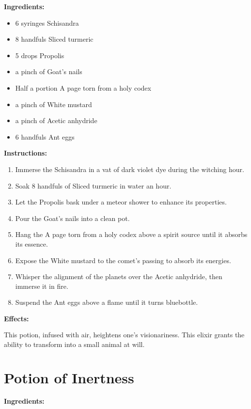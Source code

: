 \documentclass{article}
\begin{document}
\textbf{Ingredients:}

\begin{itemize}
  \item 6 syringes Schisandra
  \item 8 handfuls Sliced ​​turmeric
  \item 5 drops Propolis
  \item a pinch of Goat's nails
  \item Half a portion A page torn from a holy codex
  \item a pinch of White mustard
  \item a pinch of Acetic anhydride
  \item 6 handfuls Ant eggs
\end{itemize}

\textbf{Instructions:}

\begin{enumerate}
  \item Immerse the Schisandra in a vat of dark violet dye during the witching hour.
  \item Soak 8 handfuls of Sliced ​​turmeric in water an hour.
  \item Let the Propolis bask under a meteor shower to enhance its properties.
  \item Pour the Goat's nails into a clean pot.
  \item Hang the A page torn from a holy codex above a spirit source until it absorbs its essence.
  \item Expose the White mustard to the comet’s passing to absorb its energies.
  \item Whisper the alignment of the planets over the Acetic anhydride, then immerse it in fire.
  \item Suspend the Ant eggs above a flame until it turns bluebottle.
\end{enumerate}

\textbf{Effects:}

This potion, infused with air, heightens one's visionariness. This elixir grants the ability to transform into a small animal at will.

\newpage
\section*{Potion of Inertness}

\textbf{Ingredients:}
\end{document}
